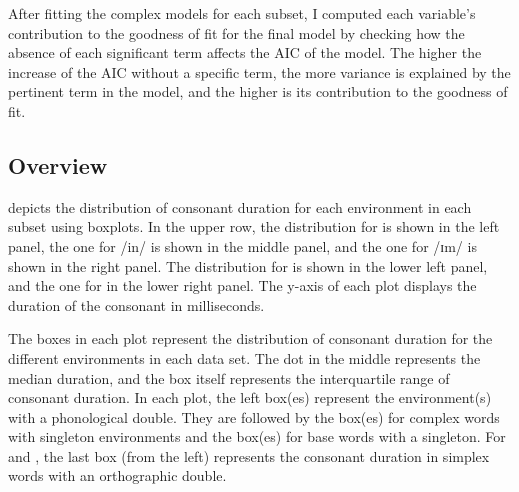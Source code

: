After fitting the complex models for each subset, I computed each variable's contribution to the goodness of fit for the final model by checking how the absence of each significant term affects the AIC of the model. The higher the increase of the AIC without a specific term, the more variance is explained by the pertinent term in the model, and the higher is its contribution to the goodness of fit.







\subsection{Overview}
	
 depicts the distribution of consonant duration for each environment in each subset using boxplots. In the upper row, the distribution for  is shown in the left panel, the one for /in/ is shown in the middle panel, and the one for /ɪm/ is shown in the right panel. The distribution for  is shown in the lower left panel, and the one for  in the lower right panel.
The y-axis of each plot displays the duration of the consonant in milliseconds. 

The boxes in each plot represent the distribution of consonant duration for the different environments in each data set. The dot in the middle represents the median duration, and the box itself represents the interquartile range of consonant duration. 
In each plot, the left box(es) represent the environment(s) with a phonological double. They are followed by the box(es) for  complex words with singleton environments and the box(es) for base words with a singleton. For  and , the last box (from the left) represents the consonant duration in simplex words with an orthographic double.




